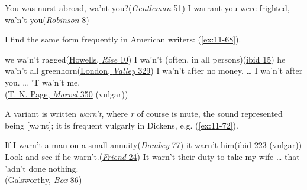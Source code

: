 \ea \label{ex:11-67}
\ea
You was nurst abroad, wa'nt you?\hfill(\href{https://ia800900.us.archive.org/29/items/compleatenglishg00deforich/compleatenglishg00deforich.pdf}{\textit{Gentleman} 51}) %
\ex
I warrant you were frighted, wa'n't you\hfill(\href{https://archive.org/details/lifeandstranges00dobsgoog/page/n33/mode/2up?q=%22warrant+you+were%22&view=theater}{\textit{Robinson} 8})
\z \z

I find the same form frequently in American writers: (\ref{ex:11-68}).

\ea \label{ex:11-68}
\ea
we wa'n't ragged\hfill(\href{https://archive.org/details/riseofsilaslapha0000will_r0t6/page/6/mode/2up?view=theater&q=%22ragged%22}{Howells, \textit{Rise} 10})
\ex
I wa'n't \phantom{x} (often, in all persons)\hfill(\href{https://archive.org/details/riseofsilaslapha0000will_r0t6/page/10/mode/2up?view=theater&q=%22wa%27n%27t%22}{ibid 15})
\ex
he wa'n't all greenhorn\hfill(\href{https://archive.org/details/valleyofmoon00londrich/page/n337/mode/2up?view=theater&q=%22he+wa%27n%27t%22}{London, \textit{Valley} 329}) %
\ex
I wa'n't after no money. {\dots} I wa'n't after you. {\dots} 'T wa'n't me.\\\hfill(\href{https://archive.org/details/johnmarvelassistant00pageiala/page/80/mode/2up?q=%22wa%27n%27t+after+no+money%22&view=theater}{T. N. Page, \textit{Marvel} 350} (vulgar)) %
\z
\z


A variant is written \textit{warn't}, where \textit{r} of course is mute, the sound represented being [wɔˑnt]; it is frequent vulgarly in Dickens, e.g. (\ref{ex:11-72}).

\ea \label{ex:11-72}
    \ea
        If I warn't a man on a small annuity\hfill(\href{https://archive.org/details/dombeyson00dick_0/page/126/mode/2up?q=%22if+I+warn%27t+a+man%22&view=theater}{\textit{Dombey} 77})
    \ex
        it warn't him\hfill(\href{https://archive.org/details/dombeyson00dick_0/page/352/mode/2up?q=%22It+warn%27t+him%22&view=theater}{ibid 223} (vulgar))
    \ex
        Look and see if he warn't.\hfill(\href{https://archive.org/details/ourmutualfriendc0000char/page/18/mode/2up?q=%22See+if+he+warn%E2%80%99t%22&view=theater}{\textit{Friend} 24}) %
    \ex
        It warn't their duty to take my wife {\dots} that 'adn't done nothing.\\\hfill(\href{https://archive.org/details/silverboxcomedyi00gals/page/86/mode/2up?q=%22warn%27t%22&view=theater}{Galsworthy, \textit{Box} 86}) %
    \z
\z

